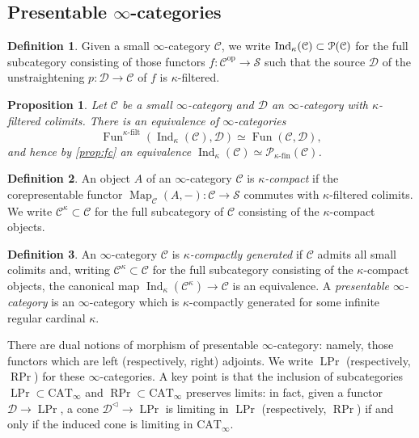 \documentclass{article}
\newtheorem{proposition}{Proposition}[subsection]
\theoremstyle{definition}
\newtheorem{definition}{Definition}[subsection]
\newcommand{\C}{\mathcal{C}}
\newcommand{\D}{\mathcal{D}}
\renewcommand{\P}{\mathcal{P}}
\renewcommand{\S}{\mathcal{S}}
\renewcommand{\i}{\infty}
\newcommand{\op}{\mathrm{op}}
\DeclareMathOperator{\Fun}{Fun}
\DeclareMathOperator{\Map}{Map}
\DeclareMathOperator{\PrL}{LPr}
\DeclareMathOperator{\PrR}{RPr}
\DeclareMathOperator{\Ind}{Ind}
\begin{document}
\subsection{Presentable $\infty$-categories}

\begin{definition}
Given a small $\infty$-category $\C$, we write
$
\Ind_\kappa(\C)\subset\P(\C)\index{$\Ind_\kappa$}
$
for the full subcategory consisting of those functors $f:\C^{\op}\to\S$ such that the source $\D$ of the unstraightening $p:\D\to\C$ of $f$ is $\kappa$-filtered.
\end{definition}
\begin{proposition}{\em \cite[Proposition 5.3.5.10]{HTT}}
Let $\C$ be a small $\i$-category and $\D$ an $\i$-category with $\kappa$-filtered colimits. There is an equivalence of $\i$-categories
\[
\Fun^{\kappa\textrm{-}\mathrm{filt}}(\Ind_\kappa(\C),\D)\simeq\Fun(\C,\D),
\]
and hence by \autoref{prop:fc} an equivalence $\Ind_\kappa(\C)\simeq\P_{\kappa\textrm{-}\mathrm{fin}}(\C)$.
\end{proposition}


\begin{definition}
An object $A$ of an $\infty$-category $\C$ is {\em $\kappa$-compact}
if the corepresentable functor $\Map_\C(A,-):\C\to\S$ commutes with $\kappa$-filtered colimits.
We write $\C^\kappa\subset\C$
\index{$\C^\kappa$}
for the full subcategory of $\C$ consisting of the $\kappa$-compact objects.
\end{definition}

\begin{definition}
An $\infty$-category $\C$ is {\em $\kappa$-compactly generated}
if $\C$ admits all small colimits and, writing $\C^\kappa\subset\C$ for the full subcategory consisting of the $\kappa$-compact objects, the canonical map $\Ind_\kappa(\C^\kappa)\to\C$ is an equivalence.
A {\em presentable $\infty$-category}
is an $\infty$-category which is $\kappa$-compactly generated for some infinite regular cardinal $\kappa$.
\end{definition}

There are dual notions of morphism of presentable $\infty$-category: namely, those functors which are left (respectively, right) adjoints.
We write $\PrL$
\index{$\PrL$}
\index{$\PrR$}
(respectively, $\PrR$) for these $\infty$-categories.
A key point \cite[Proposition 5.5.3.13 and Theorem 5.5.3.18]{HTT} is that the inclusion of subcategories $\PrL\subset\mathrm{CAT}_\i$ and $\PrR\subset\mathrm{CAT}_\i$ preserves limits: in fact, given a functor $\D\to\PrL$, a cone $\D^\triangleleft\to\PrL$ is limiting in $\PrL$ (respectively, $\PrR$) if and only if the induced cone is limiting in $\mathrm{CAT}_\i$.
\end{document}
